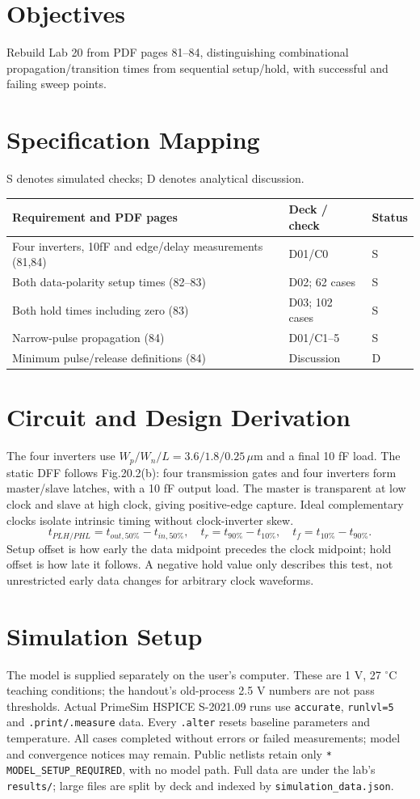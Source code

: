 \section{Objectives}
Rebuild Lab 20 from PDF pages 81--84, distinguishing combinational propagation/transition times from sequential setup/hold, with successful and failing sweep points.

\section{Specification Mapping}
S denotes simulated checks; D denotes analytical discussion.

\small\begin{longtable}{p{.46\linewidth}p{.30\linewidth}p{.15\linewidth}}\toprule
Requirement and PDF pages & Deck / check & Status \\ \midrule\endhead
Four inverters, 10fF and edge/delay measurements (81,84) & D01/C0 & S \\
Both data-polarity setup times (82--83) & D02; 62 cases & S \\
Both hold times including zero (83) & D03; 102 cases & S \\
Narrow-pulse propagation (84) & D01/C1--5 & S \\
Minimum pulse/release definitions (84) & Discussion & D \\
\bottomrule\end{longtable}\normalsize


\section{Circuit and Design Derivation}
The four inverters use $W_p/W_n/L=3.6/1.8/0.25\,\mu$m and a final 10 fF load. The static DFF follows Fig.20.2(b): four transmission gates and four inverters form master/slave latches, with a 10 fF output load. The master is transparent at low clock and slave at high clock, giving positive-edge capture. Ideal complementary clocks isolate intrinsic timing without clock-inverter skew.
\[t_{PLH/PHL}=t_{out,50\%}-t_{in,50\%},\quad t_r=t_{90\%}-t_{10\%},\quad t_f=t_{10\%}-t_{90\%}.\]
Setup offset is how early the data midpoint precedes the clock midpoint; hold offset is how late it follows. A negative hold value only describes this test, not unrestricted early data changes for arbitrary clock waveforms.

\section{Simulation Setup}
The model is supplied separately on the user's computer. These are 1 V, 27 $^\circ$C teaching conditions; the handout's old-process 2.5 V numbers are not pass thresholds. Actual PrimeSim HSPICE S-2021.09 runs use \texttt{accurate}, \texttt{runlvl=5} and \texttt{.print/.measure} data. Every \texttt{.alter} resets baseline parameters and temperature. All cases completed without errors or failed measurements; model and convergence notices may remain. Public netlists retain only \texttt{* MODEL\_SETUP\_REQUIRED}, with no model path. Full data are under the lab's \texttt{results/}; large files are split by deck and indexed by \texttt{simulation\_data.json}.

